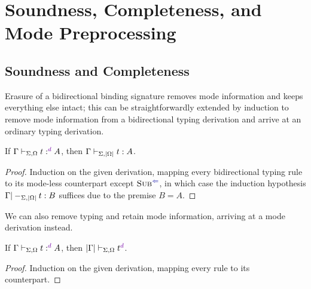 
\section{Soundness, Completeness, and Mode Preprocessing}\label{sec:pre-synthesis}


\subsection{Soundness and Completeness}
\label{sec:soundness-and-completeness}


Erasure of a bidirectional binding signature removes mode information and keeps everything else intact; this can be straightforwardly extended by induction to remove mode information from a bidirectional typing derivation and arrive at an ordinary typing derivation.

\begin{lemma}[Soundness]\label{thm:term-soundness}
If\/ $\Gamma \vdash_{\Sigma, \Omega} t :^\dir{d} A$, then $\Gamma \vdash_{\Sigma, \left|\Omega\right|} t : A$.
\end{lemma}

\begin{proof}
Induction on the given derivation, mapping every bidirectional typing rule to its mode-less counterpart except $\ChkRule{Sub}$, in which case the induction hypothesis $\Gamma |-_{\Sigma,\left|\Omega\right|} t : B$ suffices due to the premise $B = A$.
\end{proof}

We can also remove typing and retain mode information, arriving at a mode derivation instead.

\begin{proposition}\label{thm:typing-removal}
If\/ $\Gamma \vdash_{\Sigma, \Omega} t :^\dir{d} A$, then $\erase\Gamma \vdash_{\Sigma, \Omega} t^\dir{d}$.
\end{proposition}

\begin{proof}
Induction on the given derivation, mapping every rule to its counterpart.
\end{proof}

